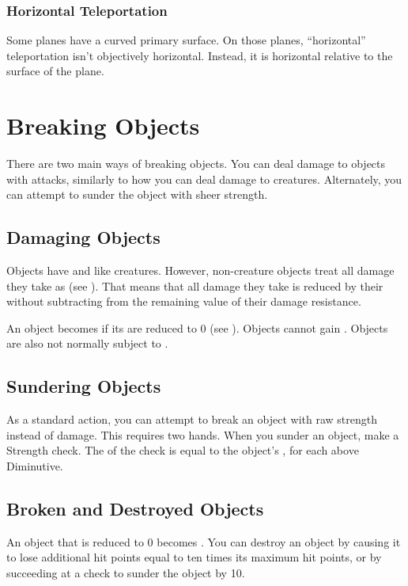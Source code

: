     \subsubsection{Horizontal Teleportation}
      Some planes have a curved primary surface.
      On those planes, ``horizontal'' teleportation isn't objectively horizontal.
      Instead, it is horizontal relative to the surface of the plane.

\section{Breaking Objects}
  There are two main ways of breaking objects.
  You can deal damage to objects with attacks, similarly to how you can deal damage to creatures.
  Alternately, you can attempt to sunder the object with sheer strength.

  \subsection{Damaging Objects}
    Objects have  and  like creatures.
    However, non-creature objects treat all damage they take as  (see ).
    That means that all damage they take is reduced by their  without subtracting from the remaining value of their damage resistance.

    An object becomes  if its  are reduced to 0 (see ).
    Objects cannot gain .
    Objects are also not normally subject to .

  \subsection{Sundering Objects}
    As a standard action, you can attempt to break an object with raw strength instead of damage.
    This requires two hands.
    When you sunder an object, make a Strength check.
    The  of the check is equal to the object's ,  for each  above Diminutive.

  \subsection{Broken and Destroyed Objects}\label{Broken and Destroyed Objects}
    An object that is reduced to 0  becomes .
    You can destroy an object by causing it to lose additional hit points equal to ten times its maximum hit points, or by succeeding at a check to sunder the object by 10.

